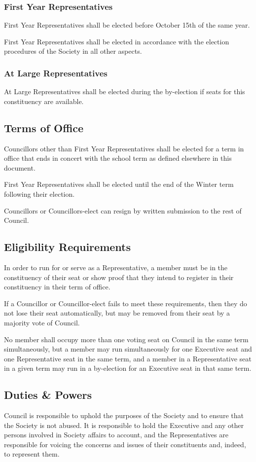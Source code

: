 \subsubsection{First Year Representatives}

First Year Representatives shall be elected before October 15th of the same
year. 

First Year Representatives shall be elected in accordance with the election
procedures of the Society in all other aspects.

\subsubsection{At Large Representatives}
At Large Representatives shall be elected during the by-election if seats for this constituency are available. 

\subsection{Terms of Office}
Councillors other than First Year Representatives shall be elected for a term in office that ends in concert with the
school term as defined elsewhere in this document.

First Year Representatives shall be elected until the end of the Winter term following their election.

Councillors or Councillors-elect can resign by written submission to the rest
of Council.

\subsection{Eligibility Requirements}
In order to run for or serve as a Representative, a member must be in the
constituency of their seat or show proof that they intend to register in their
constituency in their term of office.

If a Councillor or Councillor-elect fails to meet these requirements, then they
do not lose their seat automatically, but may be removed from their seat by a
majority vote of Council.

No member shall occupy more than one voting seat on Council in the same term
simultaneously, but a member may run simultaneously for one Executive seat and
one Representative seat in the same term, and a member in a Representative seat
in a given term may run in a by-election for an Executive seat in that same
term.

\subsection{Duties \& Powers}
Council is responsible to uphold the purposes of the Society and to
ensure that the Society is not abused. It is responsible to hold the Executive
and any other persons involved in Society affairs to account, and the
Representatives are responsible for voicing the concerns and issues of their
constituents and, indeed, to represent them. 

